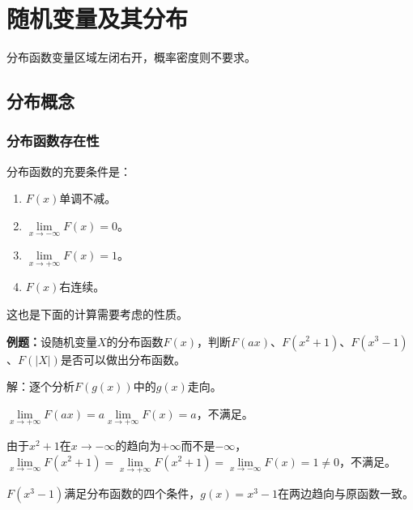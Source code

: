 \setcounter{tocdepth}{4}
\setcounter{secnumdepth}{4}
\renewcommand{\baselinestretch}{1.5}
\usepackage{multicol}
\chapter{随机变量及其分布}

分布函数变量区域左闭右开，概率密度则不要求。

\section{分布概念}

\subsection{分布函数存在性}

分布函数的充要条件是：

\begin{enumerate}
    \item $F(x)$单调不减。
    \item $\lim\limits_{x\to-\infty}F(x)=0$。
    \item $\lim\limits_{x\to+\infty}F(x)=1$。
    \item $F(x)$右连续。
\end{enumerate}

这也是下面的计算需要考虑的性质。

\textbf{例题：}设随机变量$X$的分布函数$F(x)$，判断$F(ax)$、$F(x^2+1)$、$F(x^3-1)$、$F(\vert X\vert)$是否可以做出分布函数。

解：逐个分析$F(g(x))$中的$g(x)$走向。

$\lim\limits_{x\to+\infty}F(ax)=a\lim\limits_{x\to+\infty}F(x)=a$，不满足。

由于$x^2+1$在$x\to-\infty$的趋向为$+\infty$而不是$-\infty$，$\lim\limits_{x\to-\infty}F(x^2+1)=\lim\limits_{x\to+\infty}F(x^2+1)=\lim\limits_{x\to-\infty}F(x)=1\neq0$，不满足。

$F(x^3-1)$满足分布函数的四个条件，$g(x)=x^3-1$在两边趋向与原函数一致。

